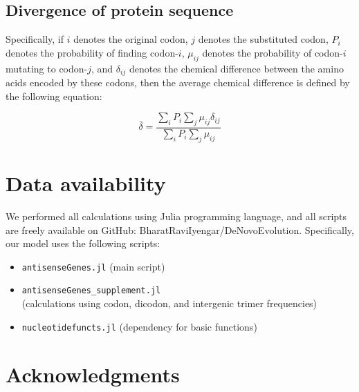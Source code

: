 \documentclass[12pt,a4paper]{article}
\begin{document}
\subsection{Divergence of protein sequence}
Specifically, if $i$ denotes the original codon, $j$ denotes the substituted codon, $P_i$ denotes the probability of finding codon-$i$, $\mu_{ij}$ denotes the probability of codon-$i$ mutating to codon-$j$, and $\delta_{ij}$ denotes the chemical difference between the amino acids encoded by these codons, then the average chemical difference is defined by the following equation:

\begin{equation}
\bar{\delta} = \frac{\displaystyle\sum_i P_i \sum_j \mu_{ij}\delta_{ij}}{\displaystyle\sum_i P_i \sum_j \mu_{ij}}
\end{equation}


\section*{Data availability}
We performed all calculations using Julia programming language, and all scripts are freely available on GitHub: BharatRaviIyengar/DeNovoEvolution. Specifically, our model uses the following scripts:

\vspace{-2em}
\begin{itemize}\setlength{\itemsep}{-1pt}
\item \texttt{antisenseGenes.jl} (main script)
\item \texttt{antisenseGenes\_supplement.jl} \\(calculations using codon, dicodon, and intergenic trimer frequencies)
\item \texttt{nucleotidefuncts.jl} (dependency for basic functions)
\end{itemize}

\section*{Acknowledgments}



\small

\end{document}
